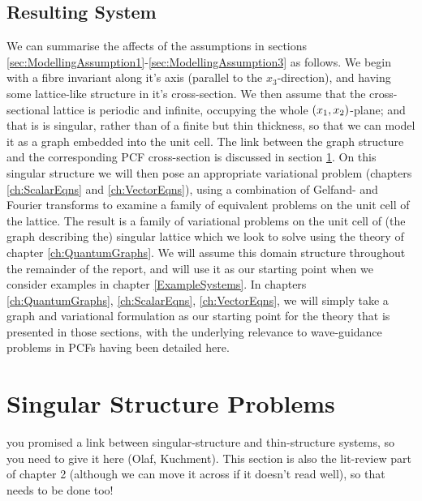 \subsection{Resulting System} \label{sec:OurSystem}
We can summarise the affects of the assumptions in sections \ref{sec:ModellingAssumption1}-\ref{sec:ModellingAssumption3} as follows.
We begin with a fibre invariant along it's axis (parallel to the $x_3$-direction), and having some lattice-like structure in it's cross-section.
We then assume that the cross-sectional lattice is periodic and infinite, occupying the whole $\left( x_1,x_2 \right)$-plane; and that is is singular, rather than of a finite but thin thickness, so that we can model it as a graph embedded into the unit cell.
The link between the graph structure and the corresponding PCF cross-section is discussed in section \ref{sec:GraphLitReview}.
On this singular structure we will then pose an appropriate variational problem (chapters \ref{ch:ScalarEqns} and \ref{ch:VectorEqns}), using a combination of Gelfand- and Fourier transforms to examine a family of equivalent problems on the unit cell of the lattice.
The result is a family of variational problems on the unit cell of (the graph describing the) singular lattice which we look to solve using the theory of chapter \ref{ch:QuantumGraphs}.
We will assume this domain structure throughout the remainder of the report, and will use it as our starting point when we consider examples in chapter \ref{ExampleSystems}.
In chapters \ref{ch:QuantumGraphs}, \ref{ch:ScalarEqns}, \ref{ch:VectorEqns}, we will simply take a graph and variational formulation as our starting point for the theory that is presented in those sections, with the underlying relevance to wave-guidance problems in PCFs having been detailed here.

\section{Singular Structure Problems} \label{sec:GraphLitReview}
you promised a link between singular-structure and thin-structure systems, so you need to give it here (Olaf, Kuchment).
This section is also the lit-review part of chapter 2 (although we can move it across if it doesn't read well), so that needs to be done too!

